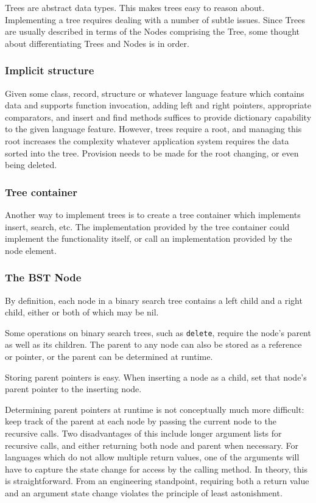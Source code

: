 \documentclass{article}
\begin{document}
Trees are abstract data types. This makes trees easy to reason about.
Implementing a tree requires dealing with a number of subtle issues.
Since Trees are usually described in terms of the Nodes comprising
the Tree, some thought about differentiating Trees and Nodes is in order.

\subsubsection{Implicit structure}

Given some class, record, structure or whatever language feature which contains
data and supports function invocation, adding left and right pointers,
appropriate comparators, and insert and find methods suffices to provide
dictionary capability to the given language feature. However, trees require a
root, and managing this root increases the complexity whatever application
system requires the data sorted into the tree. Provision needs to be made for
the root changing, or even being deleted.

\subsubsection{Tree container}

Another way to implement trees is to create a tree container which implements
insert, search, etc. The implementation provided by the tree container could
implement the functionality itself, or call an implementation provided by
the node element.

\subsubsection{The BST Node}

By definition, each node in a binary search tree contains a left child and
a right child, either or both of which may be nil.

Some operations on binary search trees, such as {\tt delete}, require
the node's parent as well as its children. The parent to any node can also
be stored as a reference or pointer, or the parent can be determined at
runtime.

Storing parent pointers is easy. When inserting a node as a child, set that
node's parent pointer to the inserting node.

Determining parent pointers at runtime is not conceptually much more difficult:
keep track of the parent at each node by passing the current node to the
recursive calls. Two disadvantages of this include longer argument lists
for recursive calls, and either returning both node and parent when necessary.
For languages which do not allow multiple return values, one of the arguments
will have to capture the state change for access by the calling method.
In theory, this is straightforward. From an engineering standpoint, requiring
both a return value and an argument state change violates the principle of
least astonishment.
\end{document}
